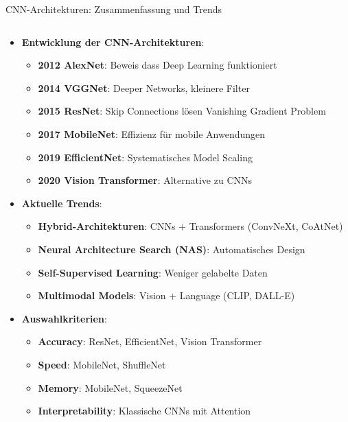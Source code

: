 \documentclass[aspectratio=1610, xcolor=dvipsnames, 9pt]{beamer}
\begin{document}
      \begin{frame}{CNN-Architekturen: Zusammenfassung und Trends}
        \begin{columns}
          \begin{column}{1\textwidth}
            \begin{itemize}
              \item \textbf{Entwicklung der CNN-Architekturen}:
              \begin{itemize}
                \item \textbf{2012 AlexNet}: Beweis dass Deep Learning funktioniert
                \item \textbf{2014 VGGNet}: Deeper Networks, kleinere Filter
                \item \textbf{2015 ResNet}: Skip Connections lösen Vanishing Gradient Problem
                \item \textbf{2017 MobileNet}: Effizienz für mobile Anwendungen
                \item \textbf{2019 EfficientNet}: Systematisches Model Scaling
                \item \textbf{2020 Vision Transformer}: Alternative zu CNNs
              \end{itemize}
              \item \textbf{Aktuelle Trends}:
              \begin{itemize}
                \item \textbf{Hybrid-Architekturen}: CNNs + Transformers (ConvNeXt, CoAtNet)
                \item \textbf{Neural Architecture Search (NAS)}: Automatisches Design
                \item \textbf{Self-Supervised Learning}: Weniger gelabelte Daten
                \item \textbf{Multimodal Models}: Vision + Language (CLIP, DALL-E)
              \end{itemize}
              \item \textbf{Auswahlkriterien}:
              \begin{itemize}
                \item \textbf{Accuracy}: ResNet, EfficientNet, Vision Transformer
                \item \textbf{Speed}: MobileNet, ShuffleNet
                \item \textbf{Memory}: MobileNet, SqueezeNet
                \item \textbf{Interpretability}: Klassische CNNs mit Attention
              \end{itemize}
            \end{itemize}
          \end{column}
        \end{columns}
      \end{frame}
\end{document}
